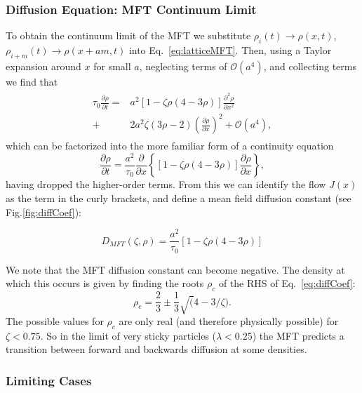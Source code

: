 \documentclass[
reprint, amsmath,amssymb,
]{revtex4-1}
\newcommand{\partDeriv}[2]{\frac{\partial #1}{\partial #2}}
\begin{document}
\subsubsection{Diffusion Equation: MFT Continuum Limit}
 To obtain the continuum limit of the MFT we substitute $\rho_i(t)
 \rightarrow \rho(x, t)$, $\rho_{i+m}(t) \rightarrow \rho(x + am, t)$
 into Eq.~\ref{eq:latticeMFT}.  Then, using a Taylor expansion around $x$ for
 small $a$, neglecting terms of $\mathcal{O}(a^4)$, and collecting
 terms we find that
\begin{align}
 \begin{split}
  \tau_0 \partDeriv{\rho}{t} =& a^2 \left[ 1-\zeta \rho (4-3\rho)  \right] \partDeriv{^2 \rho}{x^2} 
\\
  +& 2 a^2 \zeta (3\rho-2) \left(\partDeriv{\rho}{x}\right)^2 + \mathcal{O}(a^4) ,
 \end{split}
\end{align}
which can be factorized into the more familiar form of a continuity equation
\begin{equation}
\label{eq:contPDE}
 \partDeriv{\rho}{t} = \frac{a^2}{\tau_0} \partDeriv{}{x} \left\{ \left[1 - \zeta \rho\left(4-3\rho\right) \right] \partDeriv{\rho}{x} \right\},
\end{equation}
having dropped the higher-order terms.  From this we can identify the
flow $J(x)$ as the term in the curly brackets, and define a mean field
diffusion constant (see Fig.\ref{fig:diffCoef}):

\begin{equation} D_{MFT}(\zeta,\rho) =  \frac{a^2}{\tau_0} \left[ 1 - \zeta \rho\left(4-3\rho\right) \right ] \label{eq:diffCoef} \end{equation}

We note that the MFT diffusion constant can become negative. 
The density at
which this occurs is given by finding the roots $\rho_c$ of the RHS of Eq.~\ref{eq:diffCoef}:
\begin{equation}
\rho_c=\frac{2}{3} \pm \frac{1}{3} \sqrt(4-3/\zeta). 
\end{equation}
The possible values for $\rho_c$ are only real (and therefore physically possible) for $\zeta<0.75$.  So in the limit
of very sticky particles ($\lambda<0.25$) the MFT predicts a
transition between forward and backwards diffusion at some densities.  


\subsubsection{Limiting Cases}
\end{document}
